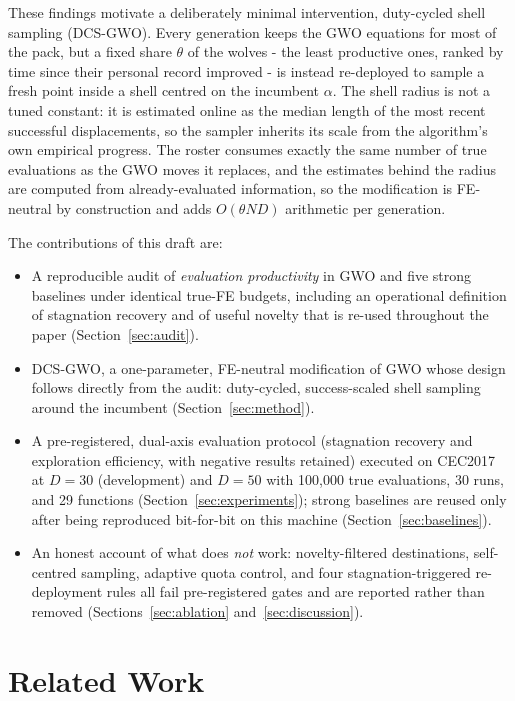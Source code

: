 \documentclass[journal]{IEEEtran}
\newcommand{\method}{DCS-GWO}
\begin{document}
These findings motivate a deliberately minimal intervention, duty-cycled
shell sampling (\method). Every generation keeps the GWO equations for most
of the pack, but a fixed share $\theta$ of the wolves - the least productive
ones, ranked by time since their personal record improved - is instead
re-deployed to sample a fresh point inside a shell centred on the incumbent
$\alpha$. The shell radius is not a tuned constant: it is estimated online as
the median length of the most recent successful displacements, so the
sampler inherits its scale from the algorithm's own empirical progress. The
roster consumes exactly the same number of true evaluations as the GWO moves
it replaces, and the estimates behind the radius are computed from
already-evaluated information, so the modification is FE-neutral by
construction and adds $O(\theta N D)$ arithmetic per generation.

The contributions of this draft are:
\begin{itemize}
\item A reproducible audit of \emph{evaluation productivity} in GWO and five
strong baselines under identical true-FE budgets, including an operational
definition of stagnation recovery and of useful novelty that is re-used
throughout the paper (Section~\ref{sec:audit}).
\item \method, a one-parameter, FE-neutral modification of GWO whose design
follows directly from the audit: duty-cycled, success-scaled shell sampling
around the incumbent (Section~\ref{sec:method}).
\item A pre-registered, dual-axis evaluation protocol (stagnation recovery
and exploration efficiency, with negative results retained) executed on
CEC2017 at $D=30$ (development) and $D=50$ with 100{,}000 true evaluations,
30 runs, and 29 functions (Section~\ref{sec:experiments}); strong baselines
are reused only after being reproduced bit-for-bit on this machine
(Section~\ref{sec:baselines}).
\item An honest account of what does \emph{not} work: novelty-filtered
destinations, self-centred sampling, adaptive quota control, and four
stagnation-triggered re-deployment rules all fail pre-registered gates and
are reported rather than removed (Sections~\ref{sec:ablation}
and~\ref{sec:discussion}).
\end{itemize}

\section{Related Work}
\end{document}
